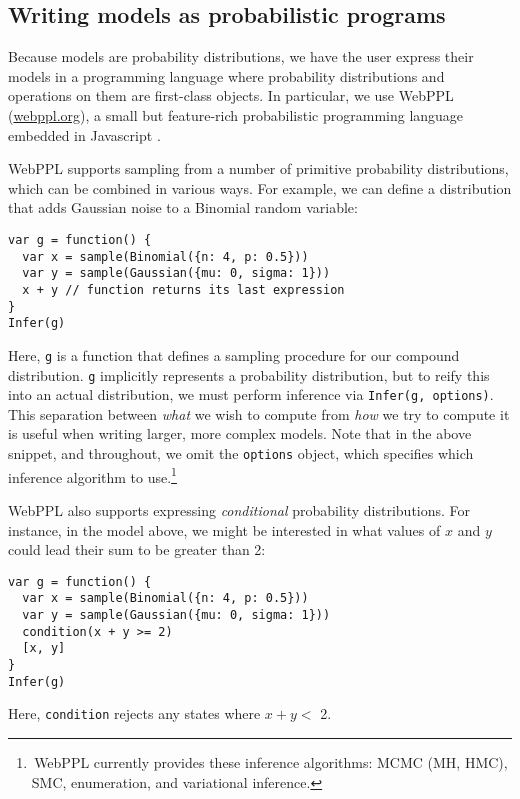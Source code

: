 \documentclass[10pt,letterpaper]{article}
\begin{document}
\subsection{Writing models as probabilistic programs}

Because models are probability distributions, we have the user express their models in a programming language where probability distributions and operations on them are first-class objects.
In particular, we use WebPPL (\url{webppl.org}), a small but feature-rich probabilistic programming language embedded in Javascript \citep{dippl}.

WebPPL supports sampling from a number of primitive probability distributions, which can be combined in various ways. For example, we can define a distribution that adds Gaussian noise to a Binomial random variable:

\begin{lstlisting}[mathescape, label={code:forward-model-simple}]
var g = function() {
  var x = sample(Binomial({n: 4, p: 0.5}))
  var y = sample(Gaussian({mu: 0, sigma: 1}))
  x + y // function returns its last expression
}
Infer(g)
\end{lstlisting}
Here, \lstinline{g} is a function that defines a sampling procedure for our compound distribution.
\lstinline{g} implicitly represents a probability distribution, but to reify this into an actual distribution, we must perform inference via \texttt{Infer(g, options)}.
This separation between \emph{what} we wish to compute from \emph{how} we try to compute it is useful when writing larger, more complex models.
Note that in the above snippet, and throughout, we omit the \texttt{options} object, which specifies which inference algorithm to use.\footnote{\,WebPPL currently provides these inference algorithms: MCMC (MH, HMC), SMC, enumeration, and variational inference.}

WebPPL also supports expressing \emph{conditional} probability distributions.
For instance, in the model above, we might be interested in what values of $x$ and $y$ could lead their sum to be greater than 2:

\begin{lstlisting}[mathescape, label={code:forward-model-complex}]
var g = function() {
  var x = sample(Binomial({n: 4, p: 0.5}))
  var y = sample(Gaussian({mu: 0, sigma: 1}))
  condition(x + y >= 2)
  [x, y]
}
Infer(g)
\end{lstlisting}
Here, \texttt{condition} rejects any states where $x + y <$ 2.
\end{document}
